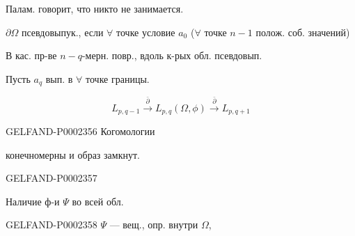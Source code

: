 Палам. говорит, что никто не занимается.



$\partial\Omega$ псевдовыпук., если $\forall$ точке условие $a_0$ ($\forall$ точке $n-1$ полож. соб. значений)



В кас. пр-ве $n-q$-мерн. повр., вдоль к-рых обл. псевдовып.



Пусть $a_q$ вып. в $\forall$ точке границы.



\begin{equation*}
 L_{p,q-1}\overset{\bar\partial}{\longrightarrow}
 L_{p,q}(\Omega,\phi)\overset{\bar\partial}{\longrightarrow}L_{p,q+1}
\end{equation*}



\begin{GelfandAdjacentEvidence}{GELFAND-P000235}{6}
Когомологии 

конечномерны и образ замкнут.
\end{GelfandAdjacentEvidence}
\begin{GelfandAdjacentEvidence}{GELFAND-P000235}{7}
 



\end{GelfandAdjacentEvidence}

Наличие ф-и $\Psi$ во всей обл.



\begin{GelfandAdjacentEvidence}{GELFAND-P000235}{8}
$\Psi$ — вещ., опр. внутри $\Omega$,



\end{GelfandAdjacentEvidence}


